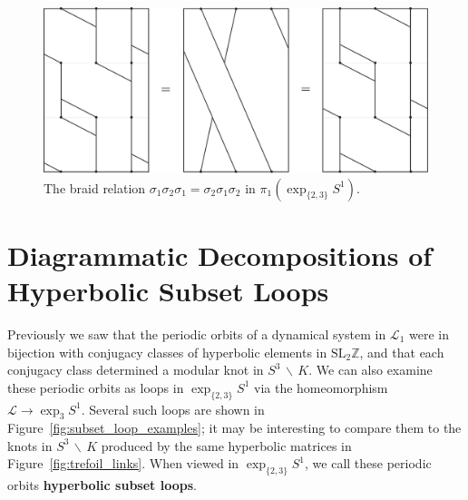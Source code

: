 \documentclass[12pt,twoside]{reedthesis}
\theoremstyle{definition}
\newcommand{\Z}{\mathbb{Z}}
\newcommand{\LS}{\mathcal{L}}
\newcommand{\SLZ}{\mathrm{SL}_2{\Z}}
\newcommand{\exptwothree}{\exp_{\{2,3\}}}
\newcommand{\wo}{\, \backslash \,}
\newcommand{\defnphrase}[1]{\textbf{#1}}
\begin{document}
\begin{figure}[h]
  \centering
  \includegraphics[width=0.8\linewidth]{figures/braid_relation_exp.pdf}
  \caption{The braid relation $\sigma_1 \sigma_2 \sigma_1 = \sigma_2 \sigma_1 \sigma_2$ in $\pi_1(\exptwothree S^1)$.}
  \label{fig:braid_relation_exp}
\end{figure}

\section{Diagrammatic Decompositions of Hyperbolic Subset Loops}

Previously we saw that the periodic orbits of a dynamical system in $\LS_1$ were in bijection with conjugacy classes of hyperbolic elements in $\SLZ$, and that each conjugacy class determined a modular knot in $S^3 \wo K$.
We can also examine these periodic orbits as loops in $\exptwothree S^1$ via the homeomorphism $\LS \to \exp_3 S^1$.
Several such loops are shown in Figure~\ref{fig:subset_loop_examples}; it may be interesting to compare them to the knots in $S^3 \wo K$ produced by the same hyperbolic matrices in Figure~\ref{fig:trefoil_links}.
When viewed in $\exptwothree S^1$, we call these periodic orbits \defnphrase{hyperbolic subset loops}.
\end{document}
